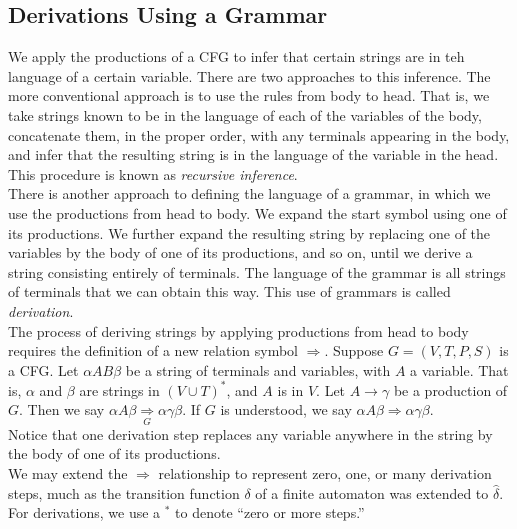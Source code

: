 \documentclass[]{article}
\begin{document}
    \subsection*{Derivations Using a Grammar}
      We apply the productions of a CFG to infer that certain strings are in teh
      language of a certain variable. There are two approaches to this
      inference. The more conventional approach is to use the rules from body to
      head. That is, we take strings known to be in the language of each of the
      variables of the body, concatenate them, in the proper order, with any
      terminals appearing in the body, and infer that the resulting string is in
      the language of the variable in the head. This procedure is known as
      \emph{recursive inference}. \\
      \indent There is another approach to defining the language of a grammar,
      in which we use the productions from head to body. We expand the start
      symbol using one of its productions. We further expand the resulting
      string by replacing one of the variables by the body of one of its
      productions, and so on, until we derive a string consisting entirely of
      terminals. The language of the grammar is all strings of terminals that we
      can obtain this way. This use of grammars is called \emph{derivation}. \\
      \indent The process of deriving strings by applying productions from head
      to body requires the definition of a new relation symbol $\Rightarrow$.
      Suppose $G = (V,T,P,S)$ is a CFG. Let $\alpha{AB}\beta$ be a string of
      terminals and variables, with $A$ a variable. That is, $\alpha$ and $\beta
      $ are strings in $(V \cup T)^*$, and $A$ is in $V$. Let $A \rightarrow
      \gamma$ be a production of $G$. Then we say $\alpha{A}\beta
      \underset{G}{\Rightarrow} \alpha\gamma\beta$. If $G$ is understood, we say
      $\alpha{A}\beta \Rightarrow \alpha\gamma\beta$. \\
      Notice that one derivation step replaces any variable anywhere in the
      string by the body of one of its productions. \\
      \indent We may extend the $\Rightarrow$ relationship to represent zero,
      one, or many derivation steps, much as the transition function $\delta$ of
      a finite automaton was extended to $\hat{\delta}$. For derivations, we use
      a $^*$ to denote ``zero or more steps.''
\end{document}
